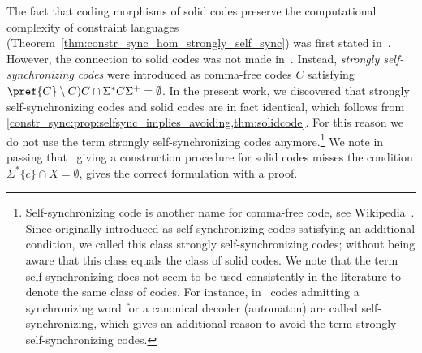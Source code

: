 \label{discussion:strongly-self-sync-codes}
The fact that coding morphisms of solid codes preserve the computational complexity of constraint languages (Theorem~\ref{thm:constr_sync_hom_strongly_self_sync}) was first stated in~\cite[Thm.~17]{DBLP:conf/fct/Hoffmann21}. However, the connection to solid codes was not made in~\cite{DBLP:conf/fct/Hoffmann21}. Instead, \emph{strongly self-synchronizing codes} were introduced as comma-free codes $C$ satisfying $\pref{C} \setminus C) C \cap \Sigma^* C \Sigma^+ = \emptyset$.
In the present work, we discovered that strongly self-synchronizing codes and solid codes are in fact identical,
which follows from \cref{constr_sync:prop:selfsync_implies_avoiding,thm:solidcode}.
For this reason we do not use the term strongly self-synchronizing codes anymore.\footnote{Self-synchronizing
	code is another name for comma-free code,
	see Wikipedia~\cite{FujiwaraTonchev2013,wiki:Self-synchronizing_code}.
	Since originally introduced as self-synchronizing codes
	satisfying an additional condition,
	we called this class strongly self-synchronizing codes; without being aware that
	this class equals the class of solid codes.
	We note that the term self-synchronizing does not seem to be used consistently in the literature
	to denote the same class of codes. For instance, in~\cite{DBLP:journals/tit/FergusonR84}
	codes admitting a synchronizing word for a canonical decoder (automaton)
	are called self-synchronizing, which gives an additional reason to avoid the term strongly self-synchronizing codes.}
We note in passing that~\cite[Remark 2]{DBLP:conf/fct/Hoffmann21} giving a construction procedure for solid codes misses 
the condition $\Sigma^*\{c\} \cap X = \emptyset$, 
gives the correct formulation with a proof.